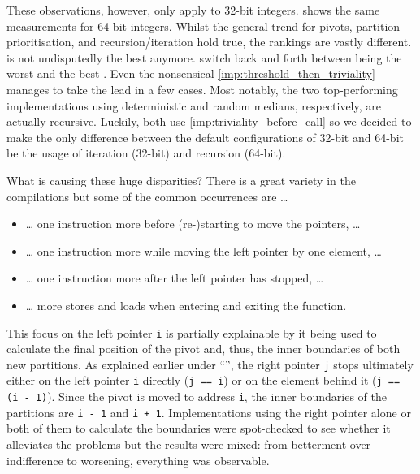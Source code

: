 These observations, however, only apply to 32-bit integers.
 shows the same measurements for 64-bit integers.
Whilst the general trend for pivots, partition prioritisation, and recursion/iteration hold true, the rankings are vastly different.
 is not undisputedly the best anymore.
 switch back and forth between being the worst and the best .
Even the nonsensical \cref{imp:threshold_then_triviality} manages to take the lead in a few cases.
Most notably, the two top-performing implementations using deterministic and random medians, respectively, are actually recursive.
Luckily, both use \cref{imp:triviality_before_call} so we decided to make the only difference between the default configurations of 32-bit and 64-bit \QS{} be the usage of iteration (32-bit) and recursion (64-bit).

What is causing these huge disparities?
There is a great variety in the compilations but some of the common occurrences are \dots{}
\begin{itemize}
	\item
	\dots{} one instruction more before (re-)starting to move the pointers, \dots{}

	\item
	\dots{} one instruction more while moving the left pointer by one element, \dots{}

	\item
	\dots{} one instruction more after the left pointer has stopped, \dots{}

	\item
	\dots{} more stores and loads when entering and exiting the function.
\end{itemize}
This focus on the left pointer \lstinline|i| is partially explainable by it being used to calculate the final position of the pivot and, thus, the inner boundaries of both new partitions.
As explained earlier under \enquote{}, the right pointer \lstinline|j| stops ultimately either on the left pointer \lstinline|i| directly (\lstinline|j == i|) or on the element behind it (\lstinline|j == (i - 1)|).
Since the pivot is moved to address \lstinline|i|, the inner boundaries of the partitions are \lstinline|i - 1| and \lstinline|i + 1|.
Implementations using the right pointer alone or both of them to calculate the boundaries were spot-checked to see whether it alleviates the problems but the results were mixed:
from betterment over indifference to worsening, everything was observable.
